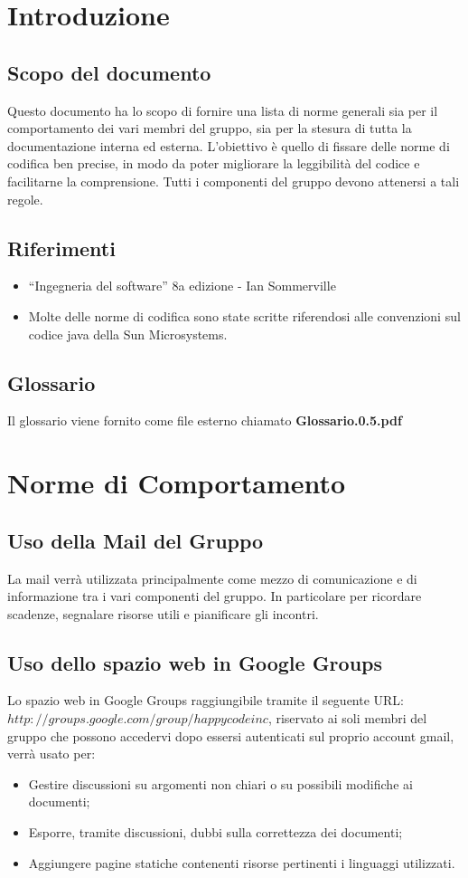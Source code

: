 \documentclass[11pt,titlepage,a4paper]{report}
\begin{document}
\tableofcontents %

\chapter{Introduzione}
\section{Scopo del documento}
Questo documento ha lo scopo di fornire una lista di norme generali sia per il comportamento dei vari membri del gruppo, sia per la stesura di tutta la documentazione interna ed esterna. L'obiettivo \`e quello di fissare delle norme di codifica ben precise, in modo da poter migliorare la leggibilit\`a del codice e facilitarne la comprensione. Tutti i componenti del gruppo devono attenersi a tali regole.
\section{Riferimenti}
\begin{itemize}
\item ``Ingegneria del software'' 8a edizione - Ian Sommerville 
\item Molte delle norme di codifica sono state scritte riferendosi alle convenzioni sul codice java della Sun Microsystems.
\end{itemize}
\section{Glossario}
Il glossario viene fornito come file esterno chiamato \textbf {Glossario.0.5.pdf} 

\chapter{Norme di Comportamento}
\section{Uso della Mail del Gruppo}
La mail verr\`a utilizzata principalmente come mezzo di comunicazione e di informazione tra i vari componenti del gruppo. In particolare per ricordare scadenze, segnalare risorse utili e pianificare gli incontri. 
\section{Uso dello spazio web in Google Groups}
Lo spazio web in Google Groups raggiungibile tramite il seguente URL: \({http://groups.google.com/group/happycodeinc}\), riservato ai soli membri del gruppo che possono accedervi dopo essersi autenticati sul proprio account gmail, verr\`a usato per:
\begin{itemize}
\item Gestire discussioni su argomenti non chiari o su possibili modifiche ai documenti;
\item Esporre, tramite discussioni, dubbi sulla correttezza dei documenti;
\item Aggiungere pagine statiche contenenti risorse pertinenti i linguaggi utilizzati.
\end{itemize}
\end{document}
